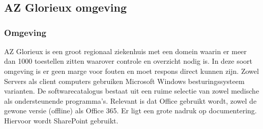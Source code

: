 \chapter{}
\label{ch:stand-van-zaken}



%
%
%

\section{AZ Glorieux omgeving}

\subsection{Omgeving}

AZ Glorieux is een groot regionaal ziekenhuis met een domein waarin er meer dan 1000 toestellen zitten waarover controle en overzicht nodig is. In deze soort omgeving is er geen marge voor fouten en moet respons direct kunnen zijn.
Zowel Servers als client computers gebruiken Microsoft Windows besturingssysteem varianten. De softwarecatalogus bestaat uit een ruime selectie van zowel medische als ondersteunende programma's. Relevant is dat Office gebruikt wordt, zowel de gewone versie (offline) als Office 365.
Er ligt een grote nadruk op documentering. Hiervoor wordt SharePoint gebruikt.

